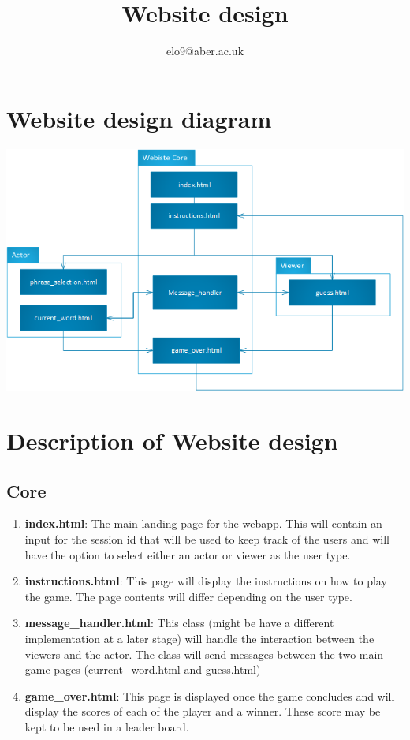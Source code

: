 \documentclass{article}
\title{Website design}
\author{elo9@aber.ac.uk}
\begin{document}
\maketitle
\tableofcontents

\newpage

\section{Website design diagram}
\includegraphics[width=\textwidth]{WebsiteDesign.png}


\section{Description of Website design}
\subsection{Core}
\begin{enumerate}
	\item \textbf{index.html}: The main landing page for the webapp. This will contain an input for the session id that will be used to keep track of the users and will have the option to select either an actor or viewer as the user type.
	
	\item \textbf{instructions.html}: This page will display the instructions on how to play the game. The page contents will differ depending on the user type.
	
	\item \textbf{message\_handler.html}: This class (might be have a different implementation at a later stage) will handle the interaction between the viewers and the actor. The class will send messages between the two main game pages (current\_word.html and guess.html)
	
	\item \textbf{game\_over.html}: This page is displayed once the game concludes and will display the scores of each of the player and a winner. These score may be kept to be used in a leader board.
	
\end{enumerate}
\end{document}
